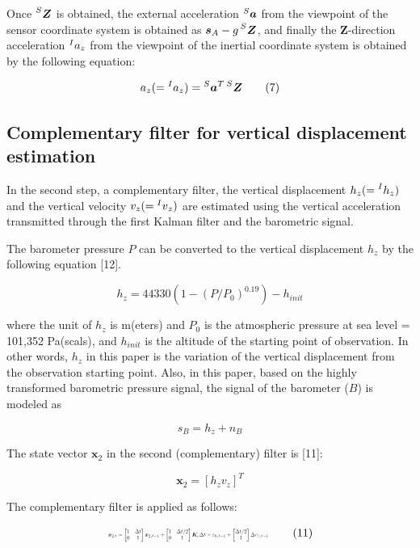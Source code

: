 \documentclass[10pt,journal,compsoc]{IEEEtran}
\begin{document}
Once $\prescript{S}{}{\bm{Z}}$ is obtained, the external acceleration
$\prescript{S}{}{\bm{a}}$ from the viewpoint of the sensor coordinate system is
obtained as  $\bm{s}_A-g\prescript{S}{}{\bm{Z}}$, and finally the $\bm{Z}$-direction
acceleration $\prescript{I}{}{a}_z$ from the viewpoint of the inertial coordinate system is
obtained by the following equation:

\[a_z(=\prescript{I}{}{a}_z)= \prescript{S}{}{\bm{a}}^T \prescript{S}{}{\bm{Z}}\tag{7}\]


\subsection{Complementary filter for vertical displacement estimation}

In the second step, a complementary filter, the vertical displacement 
$h_z (= \prescript{I}{}{h}_z)$ and the vertical velocity $v_z (= \prescript{I}{}{v}_z)$ 
are estimated using the vertical acceleration transmitted through the first Kalman filter and the barometric
signal.

The barometer pressure $P$ can be converted to the vertical displacement $h_z$ by
the following equation [12].

\[h_z = 44330(1-(P/P_0)^{0.19})-h_{init}\tag{8}\]

\noindent where the unit of $h_z$ is m(eters) and $P_0$ is the atmospheric pressure at sea level
= 101,352 Pa(scals), and $h_{init}$ is the altitude of the starting point of
observation. In other words, $h_z$ in this paper is the variation of the vertical
displacement from the observation starting point.  Also, in this paper, based
on the highly transformed barometric pressure signal, the signal of the
barometer ($B$) is modeled as

\[s_B = h_z + n_B\tag{9}\]

The state vector $\bm{x}_2$ in the second (complementary) filter is [11]:

\[\bm{x}_2 = [h_z v_z]^T\tag{10}\]

The complementary filter is applied as follows:

\begin{equation}
\resizebox{.42 \textwidth}{!} 
{
$ 
\bm{x}_{2,t} = 
\begin{bmatrix} 1 & \Delta t \\ 0 & 1 \end{bmatrix} \bm{x}_{2,t-1} +
\begin{bmatrix} 1 & \Delta t / 2 \\ 0 & 1 \end{bmatrix} \bm{K}_c\Delta t \times \varepsilon_{h,t-1} +
\begin{bmatrix} \Delta t / 2 \\ 1 \end{bmatrix} \Delta v_{z,t-1}
$
}
\tag{11}
\end{equation}
\end{document}
